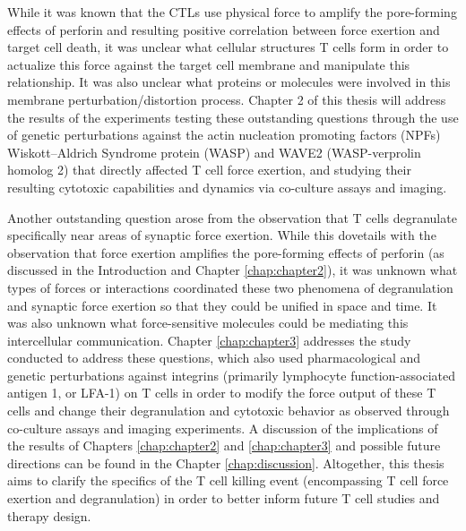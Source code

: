 While it was known that the CTLs use physical force to amplify the pore-forming effects of perforin and resulting positive correlation between force exertion and target cell death, it was unclear what cellular structures T cells form in order to actualize this force against the target cell membrane and manipulate this relationship. It was also unclear what proteins or molecules were involved in this membrane perturbation/distortion process. Chapter 2 of this thesis will address the results of the experiments testing these outstanding questions through the use of genetic perturbations against the actin nucleation promoting factors (NPFs) Wiskott–Aldrich Syndrome protein (WASP) and WAVE2 (WASP-verprolin homolog 2) that directly affected T cell force exertion, and studying their resulting cytotoxic capabilities and dynamics via co-culture assays and imaging.

Another outstanding question arose from the observation that T cells degranulate specifically near areas of synaptic force exertion. While this dovetails with the observation that force exertion amplifies the pore-forming effects of perforin (as discussed in the Introduction and Chapter \ref{chap:chapter2}), it was unknown what types of forces or interactions coordinated these two phenomena of degranulation and synaptic force exertion so that they could be unified in space and time. It was also unknown what force-sensitive molecules could be mediating this intercellular communication. Chapter \ref{chap:chapter3} addresses the study conducted to address these questions, which also used pharmacological and genetic perturbations against integrins (primarily lymphocyte function-associated antigen 1, or LFA-1) on T cells in order to modify the force output of these T cells and change their degranulation and cytotoxic behavior as observed through co-culture assays and imaging experiments. A discussion of the implications of the results of Chapters \ref{chap:chapter2} and \ref{chap:chapter3} and possible future directions can be found in the Chapter \ref{chap:discussion}. Altogether, this thesis aims to clarify the specifics of the T cell killing event (encompassing T cell force exertion and degranulation) in order to better inform future T cell studies and therapy design. 
